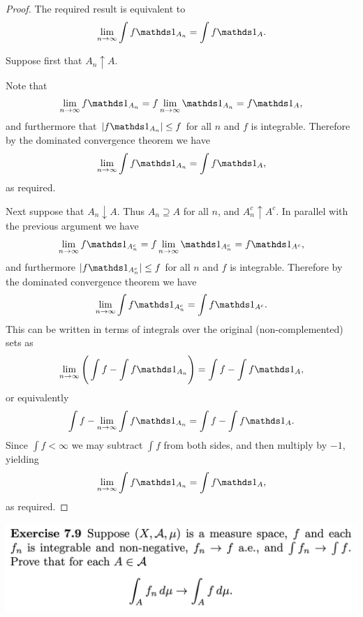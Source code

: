 \begin{proof}
  The required result is equivalent to
  \begin{align*}
    \limn \int f \ind_{A_n} = \int f \ind_A.
  \end{align*}

  Suppose first that $A_n \uparrow A$.

  Note that
  \begin{align*}
    \limn f\ind_{A_n} = f\limn\ind_{A_n} = f\ind_A,
  \end{align*}
  and furthermore that $|f\ind_{A_n}| \leq f$ for all $n$ and $f$ is integrable. Therefore by the dominated
  convergence theorem we have
  \begin{align*}
    \limn \int f \ind_{A_n} = \int f \ind_A,
  \end{align*}
  as required.

  Next suppose that $A_n \downarrow A$. Thus $A_n \supseteq A$ for all $n$, and $A_n^c \uparrow A^c$. In
  parallel with the previous argument we have
  \begin{align*}
    \limn f\ind_{A_n^c} = f\limn\ind_{A_n^c} = f\ind_{A^c},
  \end{align*}
  and furthermore $|f\ind_{A_n^c}| \leq f$ for all $n$ and $f$ is integrable.  Therefore by the dominated
  convergence theorem we have
  \begin{align*}
    \limn \int f \ind_{A_n^c} = \int f \ind_{A^c}.
  \end{align*}
  This can be written in terms of integrals over the original (non-complemented) sets as
  \begin{align*}
    \limn \Bigg(\int f - \int f \ind_{A_n}\Bigg) = \int f - \int f \ind_{A},
  \end{align*}
  or equivalently
  \begin{align*}
    \int f - \limn \int f \ind_{A_n} = \int f - \int f \ind_{A}.
  \end{align*}
  Since $\int f < \infty$ we may subtract $\int f$ from both sides, and then multiply by $-1$, yielding
  \begin{align*}
    \limn \int f \ind_{A_n} = \int f \ind_{A},
  \end{align*}
  as required.
\end{proof}

\newpage
\begin{mdframed}
\includegraphics[width=400pt]{img/analysis--berkeley-202a-hw08-3203.png}
\end{mdframed}

